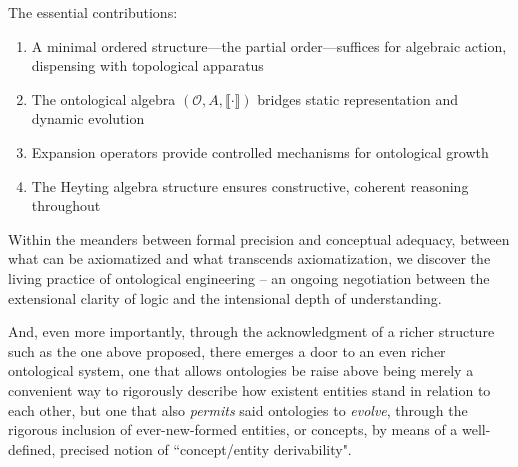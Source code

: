 \documentclass[11pt,a4paper]{article}
\newcommand{\onto}{\mathcal{O}}
\newcommand{\sem}[1]{\llbracket #1 \rrbracket}
\begin{document}
The essential contributions:
\begin{enumerate}
    \item A minimal ordered structure---the partial order---suffices for algebraic action, dispensing with topological apparatus
    \item The ontological algebra $(\onto, A, \sem{\cdot})$ bridges static representation and dynamic evolution
    \item Expansion operators provide controlled mechanisms for ontological growth
    \item The Heyting algebra structure ensures constructive, coherent reasoning throughout
\end{enumerate}

Within the meanders between formal precision and conceptual adequacy, between what can be axiomatized and what transcends axiomatization, we discover the living practice of ontological engineering -- an ongoing negotiation between the extensional clarity of logic and the intensional depth of understanding. 

And, even more importantly, through the acknowledgment of a richer structure such as the one above proposed, there emerges a door to an even richer ontological system, one that allows ontologies be raise above being merely a convenient way to rigorously describe how existent entities stand in relation to each other, but one that also \textit{permits} said ontologies to \textit{evolve}, through the rigorous inclusion of ever-new-formed entities, or concepts, by means of a well-defined, precised notion of ``concept/entity derivability".




\end{document}
